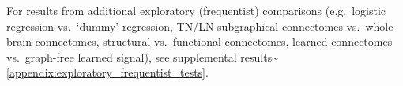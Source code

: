 \documentclass[
  notitlepage]{article}
\begin{document}
For results from additional exploratory (frequentist) comparisons
(e.g.~logistic regression vs.~`dummy' regression, TN/LN subgraphical
connectomes vs.~whole-brain connectomes, structural vs.~functional
connectomes, learned connectomes vs.~graph-free learned signal), see
supplemental
results\textasciitilde{}\ref{appendix:exploratory_frequentist_tests}.
\end{document}
